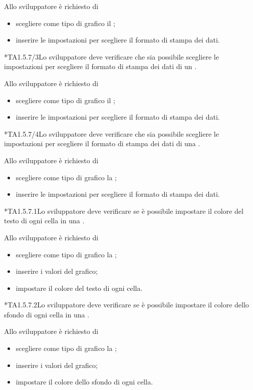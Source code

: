 		Allo sviluppatore è richiesto di
		\begin{itemize}
			\item scegliere come tipo di grafico il ;
			\item inserire le impostazioni per scegliere il formato di stampa dei dati.
		\end{itemize}

	*{TA1.5.7/3}Lo sviluppatore deve verificare che sia possibile scegliere le impostazioni per scegliere il formato di stampa dei dati di un .

		Allo sviluppatore è richiesto di
		\begin{itemize}
			\item scegliere come tipo di grafico il ;
			\item inserire le impostazioni per scegliere il formato di stampa dei dati.
		\end{itemize}

	*{TA1.5.7/4}Lo sviluppatore deve verificare che sia possibile scegliere le impostazioni per scegliere il formato di stampa dei dati di una .

		Allo sviluppatore è richiesto di
		\begin{itemize}
			\item scegliere come tipo di grafico la ;
			\item inserire le impostazioni per scegliere il formato di stampa dei dati.
		\end{itemize}

	*{TA1.5.7.1}Lo sviluppatore deve verificare se è possibile impostare il colore del testo di ogni cella in una .

		Allo sviluppatore è richiesto di
		\begin{itemize}
			\item scegliere come tipo di grafico la ;
			\item inserire i valori del grafico;
			\item impostare il colore del testo di ogni cella.
		\end{itemize}

	*{TA1.5.7.2}Lo sviluppatore deve verificare se è possibile impostare il colore dello sfondo di ogni cella in una .

		Allo sviluppatore è richiesto di
		\begin{itemize}
			\item scegliere come tipo di grafico la ;
			\item inserire i valori del grafico;
			\item impostare il colore dello sfondo di ogni cella.
		\end{itemize}

